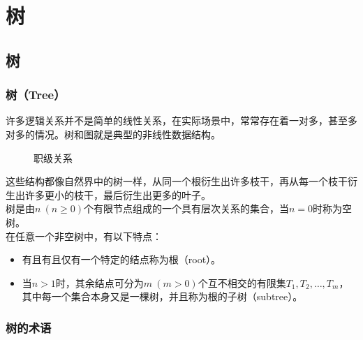 \chapter{树}

\section{树}

\subsection{树（Tree）}

许多逻辑关系并不是简单的线性关系，在实际场景中，常常存在着一对多，甚至多对多的情况。树和图就是典型的非线性数据结构。\\

\begin{figure}[H]
	\centering
	\caption{职级关系}
\end{figure}

这些结构都像自然界中的树一样，从同一个根衍生出许多枝干，再从每一个枝干衍生出许多更小的枝干，最后衍生出更多的叶子。\\

树是由$ n\ (n \ge 0) $个有限节点组成的一个具有层次关系的集合，当$ n = 0 $时称为空树。\\

在任意一个非空树中，有以下特点：

\begin{itemize}
	\item 有且有且仅有一个特定的结点称为根（root）。

	\item 当$ n > 1 $时，其余结点可分为$ m\ (m > 0) $个互不相交的有限集$ T_1, T_2, \dots, T_m $，其中每一个集合本身又是一棵树，并且称为根的子树（subtree）。
\end{itemize}

\vspace{0.5cm}

\subsection{树的术语}


